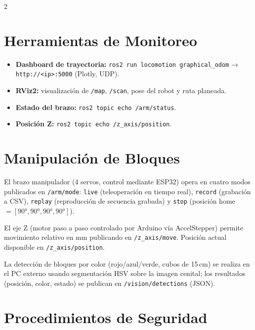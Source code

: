 \documentclass[10pt,a4paper]{article}
\newcommand{\topic}[1]{\texttt{\small #1}}
\begin{document}
\begin{multicols}{2}
\section{Herramientas de Monitoreo}

\begin{itemize}
  \item \textbf{Dashboard de trayectoria:} \texttt{ros2 run locomotion graphical\_odom} → \texttt{http://<ip>:5000} (Plotly, UDP).
  \item \textbf{RViz2:} visualización de \topic{/map}, \topic{/scan}, pose del robot y ruta planeada.
  \item \textbf{Estado del brazo:} \texttt{ros2 topic echo /arm/status}.
  \item \textbf{Posición Z:} \texttt{ros2 topic echo /z\_axis/position}.
\end{itemize}

\section{Manipulación de Bloques}

El brazo manipulador (4 servos, control mediante ESP32) opera en cuatro modos publicados en \topic{/arm/mode}: \texttt{live} (teleoperación en tiempo real), \texttt{record} (grabación a CSV), \texttt{replay} (reproducción de secuencia grabada) y \texttt{stop} (posición home $= [90°, 90°, 90°, 90°]$).

El eje Z (motor paso a paso controlado por Arduino vía AccelStepper) permite movimiento relativo en mm publicando en \topic{/z\_axis/move}. Posición actual disponible en \topic{/z\_axis/position}.

La detección de bloques por color (rojo/azul/verde, cubos de 15\,cm) se realiza en el PC externo usando segmentación HSV sobre la imagen cenital; los resultados (posición, color, estado) se publican en \topic{/vision/detections} (JSON).

\section{Procedimientos de Seguridad}


\end{multicols}
\end{document}

